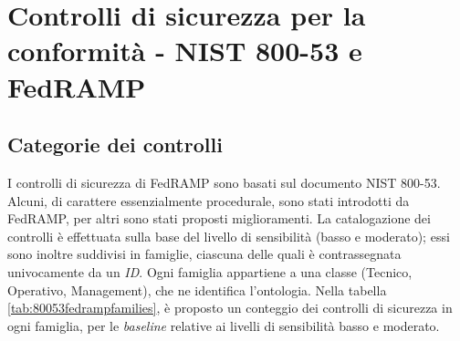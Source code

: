 \documentclass[../main.tex]{subfiles}
\begin{document}
\section{Controlli di sicurezza per la conformità - NIST 800-53 e FedRAMP}
\subsection{Categorie dei controlli}

I controlli di sicurezza di FedRAMP sono basati sul documento NIST 800-53. Alcuni, di carattere essenzialmente procedurale, sono stati introdotti da FedRAMP, per altri sono stati proposti miglioramenti.
La catalogazione dei controlli è effettuata sulla base del livello di sensibilità (basso e moderato); essi sono inoltre suddivisi in famiglie, ciascuna delle quali è contrassegnata univocamente da un \textit{ID}\cite{fedrampSCPreface}.
Ogni famiglia appartiene a una classe (Tecnico, Operativo, Management), che ne identifica l'ontologia.
Nella tabella \ref{tab:80053fedrampfamilies}, è proposto un conteggio dei controlli di sicurezza in ogni famiglia, per le \textit{baseline} relative ai livelli di sensibilità basso e moderato.
\end{document}
